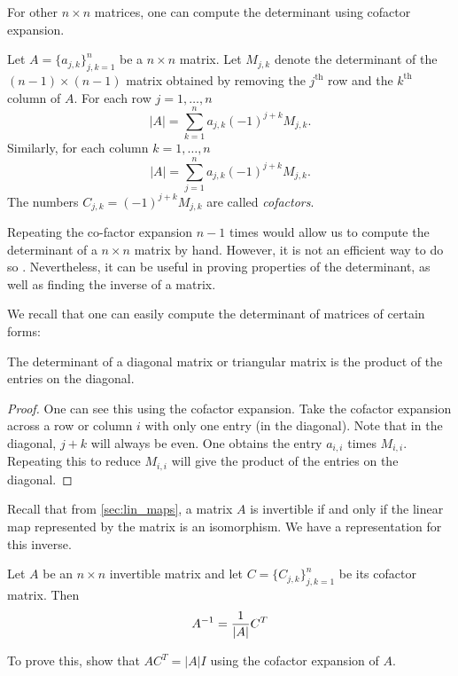 \documentclass{article}
\begin{document}
For other $n \times n$ matrices, one can compute the determinant using cofactor expansion.

\begin{definition}
Let $A = \{ a_{j,k}\}_{j,k=1}^n$ be a $n\times n$ matrix. Let $M_{j,k}$ denote the determinant of the $(n-1) \times (n-1)$ matrix obtained by removing the $j^\text{th}$ row and the $k^\text{th}$ column of $A$. For each row $j=1,\ldots,n$
\begin{equation*}
    |A| = \sum_{k=1}^n a_{j,k} (-1)^{j+k} M_{j,k}.
\end{equation*}
Similarly, for each column $k=1,\ldots,n$
\begin{equation*}
    |A| = \sum_{j=1}^n a_{j,k} (-1)^{j+k} M_{j,k}.
\end{equation*}
The numbers $C_{j,k}=(-1)^{j+k} M_{j,k}$ are called \emph{cofactors}.
\end{definition}
Repeating the co-factor expansion $n-1$ times would allow us to compute the determinant of a $n \times n$ matrix by hand. However, it is not an efficient way to do so \cite[p.92]{linalgwrong}. Nevertheless, it can be useful in proving properties of the determinant, as well as finding the inverse of a matrix.

We recall that one can easily compute the determinant of matrices of certain forms:

\begin{proposition}
The determinant of a diagonal matrix or triangular matrix is the product of the entries on the diagonal.
\end{proposition}
\begin{proof}
One can see this using the cofactor expansion. Take the cofactor expansion across a row or column $i$ with only one entry (in the diagonal). Note that in the diagonal, $j+k$ will always be even. One obtains the entry $a_{i,i}$ times $M_{i,i}$. Repeating this to reduce $M_{i,i}$ will give the product of the entries on the diagonal.
\end{proof}

Recall that from \cref{sec:lin_maps}, a matrix $A$ is invertible if and only if the linear map represented by the matrix is an isomorphism. We have a representation for this inverse.

\begin{theorem}
Let $A$ be an $n \times n$ invertible matrix and let $C=\{C_{j,k}\}_{j,k=1}^n$ be its cofactor matrix. Then
\begin{equation*}
    A^{-1} = \frac{1}{|A|} C^T
\end{equation*}
\end{theorem}
To prove this, show that $A C^T = |A| I$ using the cofactor expansion of $A$.
\end{document}
